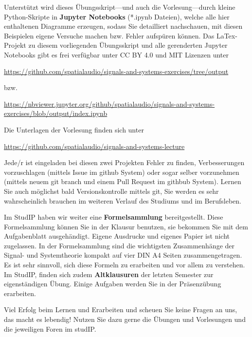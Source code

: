 Unterstützt wird dieses Übungsskript---und auch die Vorlesung---durch kleine Python-Skripte in
\textbf{Jupyter Notebooks} (*.ipynb Dateien),
welche alle hier enthaltenen Diagramme erzeugen, sodass Sie
detailliert nachschauen, mit diesen Beispielen eigene Versuche machen
bzw. Fehler aufspüren können.
%
Das LaTex-Projekt zu diesem vorliegenden Übungsskript und alle gerenderten Jupyter
Notebooks gibt es frei verfügbar unter CC BY 4.0 und MIT Lizenzen unter
\begin{mdframed}[backgroundcolor=C2!10]
\url{https://github.com/spatialaudio/signals-and-systems-exercises/tree/output}
\end{mdframed}
bzw.
\begin{mdframed}[backgroundcolor=C2!10]
\url{https://nbviewer.jupyter.org/github/spatialaudio/signals-and-systems-exercises/blob/output/index.ipynb}
\end{mdframed}
%

%
Die Unterlagen der Vorlesung finden sich unter
\begin{mdframed}[backgroundcolor=C2!10]
\url{https://github.com/spatialaudio/signals-and-systems-lecture}
\end{mdframed}
%
Jede/r ist eingeladen bei diesen zwei Projekten Fehler zu finden, Verbesserungen
vorzuschlagen (mittels Issue im github System) oder sogar selber vorzunehmen
(mittels neuem git branch und einem Pull Request im githbub System).
%
Lernen Sie auch möglichst bald Versionskontrolle mittels git, Sie werden es sehr
wahrscheinlich brauchen im weiteren Verlauf des Studiums und im Berufsleben.


Im StudIP haben wir weiter eine \textbf{Formelsammlung} bereitgestellt.
%
Diese Formelsammlung können Sie in der Klausur benutzen, sie bekommen Sie
mit dem Aufgabenblatt ausgehändigt.
%
Eigene Ausdrucke und eigenes Papier ist nicht zugelassen.
%
In der Formelsammlung sind die wichtigsten Zusammenhänge der Signal- und
Systemtheorie kompakt auf vier DIN A4 Seiten zusammengetragen.
%
Es ist sehr sinnvoll, sich diese Formeln zu erarbeiten und vor allem zu verstehen.
%
Im StudIP, finden sich zudem \textbf{Altklausuren} der letzten Semester zur eigenständigen Übung. Einige Aufgaben werden Sie in der Präsenzübung erarbeiten.

Viel Erfolg beim Lernen und Erarbeiten und scheuen Sie keine Fragen an uns, das macht es lebendig!
Nutzen Sie dazu gerne die Übungen und Vorlesungen und die
jeweiligen Foren im studIP.


\newpage
